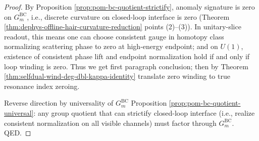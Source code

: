 \begin{proof}
By Proposition \ref{prop:pom-bc-quotient-strictify}, anomaly signature is zero on \(G^{\mathrm{BC}}_m\), i.e., discrete curvature on closed-loop interface is zero (Theorem \ref{thm:dephys-offline-hair-curvature-reduction} points (2)–(3)).
In unitary-slice readout, this means one can choose consistent gauge in homotopy class normalizing scattering phase to zero at high-energy endpoint; and on \(U(1)\), existence of consistent phase lift and endpoint normalization hold if and only if loop winding is zero.
Thus we get first paragraph conclusion; then by Theorem \ref{thm:selfdual-wind-deg-dbl-kappa-identity} translate zero winding to true resonance index zeroing.
\par
Reverse direction by universality of \(G^{\mathrm{BC}}_m\) Proposition \ref{prop:pom-bc-quotient-universal}: any group quotient that can strictify closed-loop interface (i.e., realize consistent normalization on all visible channels) must factor through \(G^{\mathrm{BC}}_m\). QED.
\end{proof}

